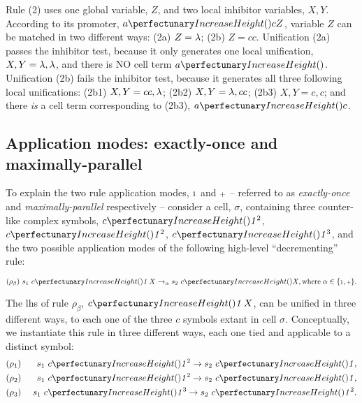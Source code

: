 Rule (2) uses one global variable, \(Z\), and two local inhibitor variables, \(X, Y\).
According to its promoter, \(\cpfunc{a}{cZ}\), variable \(Z\) can be matched in two different ways: 
(2a) \(Z = \lambda\); (2b) \(Z = cc\).
Unification (2a) passes the inhibitor test, because it only generates one local unification,
\(X, Y = \lambda, \lambda\), and there is NO cell term \(\cpfunc{a}{}\).
Unification (2b) fails the inhibitor test, because it generates all three following local unifications:
(2b1) \(X, Y = cc, \lambda\); (2b2) \(X, Y = \lambda, cc\); (2b3) \(X, Y = c, c\); 
and there \emph{is} a cell term corresponding to (2b3), \(\cpfunc{a}{c}\).

\subsection{Application modes: exactly-once and maximally-parallel}
To explain the two rule application modes, \({\scriptstyle 1}\) and \({\scriptstyle +}\) -- referred to as \emph{exactly-once} and \emph{maximally-parallel} respectively -- consider a cell, \(\sigma\), containing three counter-like complex symbols,
\(\cpfunc{c}{\cpundig^2}\), \(\cpfunc{c}{\cpundig^2}\), \(\cpfunc{c}{\cpundig^3}\),
and the two possible application modes of the following high-level ``decrementing'' rule:
\vspace{-0.2cm}
\begin{framed}
\vspace{-0.5cm}
\[(\rho_\beta) ~s_1 ~\cpfunc{c}{\cpundig \, X} \rightarrow_{\alpha} s_2 ~\cpfunc{c}{X},\\
\mathrm{where} \; \alpha \in \{\cponce, \cpmaxpar\}.\]
\vspace{-0.8cm}
\end{framed}

The \gls{lhs} of rule \(\rho_\beta\), \(\cpfunc{c}{\cpundig \, X}\), can be unified in three different ways,
to each one of the three \(c\) symbols extant in cell \(\sigma\).
Conceptually, we instantiate this rule in three different ways,
each one tied and applicable to a distinct symbol:
\begin{eqnarray*}
& (\rho_1)  & ~s_1 ~\cpfunc{c}{\cpundig^2} \rightarrow s_2 ~\cpfunc{c}{\cpundig},\\
& (\rho_2)  & ~s_1 ~\cpfunc{c}{\cpundig^2} \rightarrow s_2 ~\cpfunc{c}{\cpundig},\\
& (\rho_3) & ~s_1 ~\cpfunc{c}{\cpundig^3} \rightarrow s_2 ~\cpfunc{c}{\cpundig^2}.
\end{eqnarray*}

